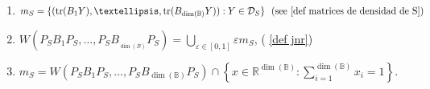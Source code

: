 \documentclass[10pt,a4paper]{amsart}
\def\calB{\mathcal B}
\def\tr{\text{tr}}
\begin{document}
\begin{proposition}
\begin{enumerate}
		\item \label{item4Prop1}
		$\displaystyle{
		m_S=\{(\tr(B_1Y),\dots,\tr(B_{\dim(\mathbb{B})} Y)): Y\in \mathcal{D}_S\} \ \ \text{(see \eqref{def matrices de densidad de S})}
			}$
		\item \label{item5Prop1}
		$
		\displaystyle{
		W(P_SB_1P_S,\dots,P_SB_{_{\dim(\calB)}}P_S)=\bigcup_{\varepsilon\in[0,1]} \varepsilon m_S}$, ( \eqref{def jnr})
		
		\item \label{item6Prop1}
		$\displaystyle{
		m_S=W(P_SB_1P_S,\dots,P_SB_{{\dim(\mathbb{B})}}P_S)\cap \left\{ x\in \mathbb{R}^{{\dim(\mathbb{B})}}: \sum_{i=1}^{\dim(\mathbb{B})} x_i=1 \right\}
		}$.
	\end{enumerate}
\end{proposition}
\end{document}
